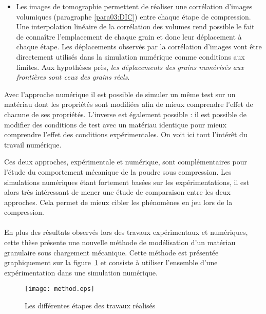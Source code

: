 \begin{itemize}
\begin{itemize}
		\item Les images de tomographie permettent de réaliser une corrélation d'images volumiques (paragraphe \ref{para03:DIC}) entre chaque étape de compression. Une interpolation linéaire de la corrélation des volumes rend possible le fait de connaître l'emplacement de chaque grain et donc leur déplacement à chaque étape. Les déplacements observés par la corrélation d'images vont être directement utilisés dans la simulation numérique comme conditions aux limites. Aux hypothèses près, \emph{les déplacements des grains numérisés aux frontières sont ceux des grains réels}.
	\end{itemize}
	Avec l'approche numérique il est possible de simuler un même test sur un matériau dont les propriétés sont modifiées afin de mieux comprendre l'effet de chacune de ses propriétés. L'inverse est également possible : il est possible de modifier des conditions de test avec un matériau identique pour mieux comprendre l'effet des conditions expérimentales. On voit ici tout l'intérêt du travail numérique.
\end{itemize}
Ces deux approches, expérimentale et numérique, sont complémentaires pour l'étude du comportement mécanique de la poudre sous compression. Les simulations numériques étant fortement basées sur les expérimentations, il est alors très intéressant de mener une étude de comparaison entre les deux approches. Cela permet de mieux cibler les phénomènes en jeu lors de la compression.
\paragraph{}En plus des résultats observés lors des travaux expérimentaux et numériques, cette thèse présente une nouvelle méthode de modélisation d'un matériau granulaire sous chargement mécanique. Cette méthode est présentée graphiquement sur la figure~\ref{fig:02-method} et consiste à utiliser l'ensemble d'une expérimentation dans une simulation numérique.
\begin{figure}\centering
	\texttt{[image: method.eps]}
	\caption{\label{fig:02-method}Les différentes étapes des travaux réalisés}
\end{figure}